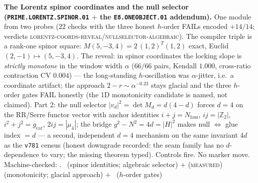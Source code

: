 \documentclass[11pt,a4paper]{article}
\newcommand{\gcar}{g_{\mathrm{car}}}
\newcommand{\Nfam}{N_{\mathrm{fam}}}
\newcommand{\Z}{\mathbb{Z}}
\theoremstyle{definition}
\begin{document}
\par\smallskip\noindent\textbf{The Lorentz spinor coordinates and
the null selector (\texttt{PRIME.LORENTZ.SPINOR.01} $+$ the
\texttt{E8.ONEOBJECT.01} addendum).}
One module from two probes ($22$ checks with the three honest
$h$-order FAILs encoded $+14/14$; verdicts
\textsc{lorentz-coords-reveal}/\textsc{nullselector-algebraic}).
The compiler triple is a rank-one spinor square:
$M(5,-3,4)=2\,(1,2)^{T}(1,2)$ exact, Euclid
$(2,-1)\mapsto(5,-3,4)$.  The reveal: in spinor coordinates the
locking slope is \emph{strictly monotone} in the window width
$\alpha$ ($66/66$ pairs, Kendall $1.000$, cross-ratio contraction
CV $0.004$) --- the long-standing $h$-oscillation was $\alpha$-jitter,
i.e.\ a coordinate artifact; the approach $2-r\sim\alpha^{-0.23}$
stays glacial and the three $h$-order gates FAIL honestly (the 1D
monotonicity candidate is named, not claimed).  Part 2: the null
selector $|v_d|^2=\det M_d=d(4-d)$ forces $d=4$ on the RR/Serre
functor vector with anchor identities $i{+}j=\Nfam$, $ij=|\Z_2|$,
$i^2{+}j^2=\gcar$, $2ij=|\mu_4|$; the bridge $g^2-N^2=4d=|H|^2$
makes null $\iff$ glue index $=d$ --- a second, independent $d=4$
mechanism on the same invariant $4d$ as the \texttt{v781} census
(honest downgrade recorded: the seam family has no $d$-dependence
to vary; the missing theorem typed).  Controls fire.  No marker
move.
Machine-checked: .
\mE\ (spinor identities; algebraic selector) $+$
(\textsc{measured}) (monotonicity; glacial approach) $+$ \mO\
($h$-order gates)
\par\smallskip
\end{document}
